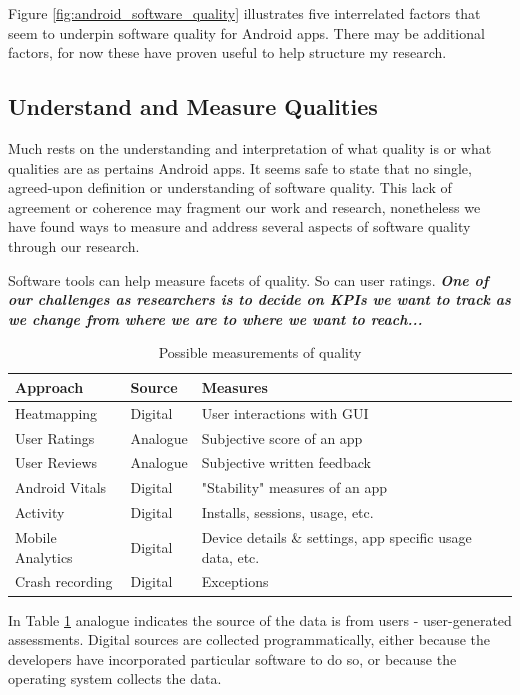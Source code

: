 Figure \ref{fig:android_software_quality} illustrates five interrelated factors that seem to underpin software quality for Android apps. There may be additional factors, for now these have proven useful to help structure my research.

\subsection{Understand and Measure Qualities}
Much rests on the understanding and interpretation of what quality is or what qualities are as pertains Android apps. It seems safe to state that no single, agreed-upon definition or understanding of software quality. This lack of agreement or coherence may fragment our work and research, nonetheless we have found ways to measure and address several aspects of software quality through our research.

Software tools can help measure facets of quality. So can user ratings. \textbf{\textit{One of our challenges as researchers is to decide on KPIs we want to track as we change from where we are to where we want to reach...}}

\begin{table}[]
    \centering
    \footnotesize
    \begin{tabular}{l|l|l}
        Approach     & Source & Measures \\
        \hline
        Heatmapping  & Digital & User interactions with GUI \\
        User Ratings & Analogue & Subjective score of an app \\
        User Reviews & Analogue & Subjective written feedback \\
        Android Vitals & Digital & "Stability" measures of an app \\
        Activity & Digital & Installs, sessions, usage, etc. \\
        Mobile Analytics & Digital & Device details \& settings, app specific usage data, etc. \\
        Crash recording & Digital & Exceptions 
    \end{tabular}
    \caption{Possible measurements of quality}
    \label{tab:quality_measurements}
\end{table}

In Table \ref{tab:quality_measurements} analogue indicates the source of the data is from users - user-generated assessments. Digital sources are collected programmatically, either because the developers have incorporated particular software to do so, or because the operating system collects the data.

